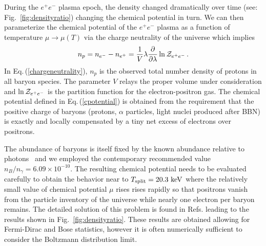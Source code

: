\documentclass[a4paper]{article}
\newcommand*{\keV}{\text{ keV}}
\newcommand{\req}[1]{Eq.\,(\ref{#1})}
\newcommand{\rf}[1]{Fig.~{\ref{#1}}}
\newcommand*{\xblue}{\color{black}}
\begin{document}
{\xblue During the $e^{+}e^{-}$ plasma epoch, the density changed dramatically over time (see: \rf{fig:densityratio}) changing the chemical potential in turn. We can then parameterize the chemical potential of the $e^{+}e^{-}$ plasma as a function of temperature $\mu\rightarrow\mu(T)$ via the charge neutrality of the universe which implies}
\begin{align}
    \label{chargeneutrality}
    n_{p}=n_{e^{-}}-n_{e^{+}}=\frac{1}{V}\lambda\frac{\partial}{\partial\lambda}\ln{\cal Z}_{e^{+}e^{-}}\,.
\end{align}
{\xblue In \req{chargeneutrality}, $n_{p}$ is the observed total number density of protons in all baryon species. The parameter $V$ relays the proper volume under consideration and $\ln{\cal Z}_{e^{+}e^{-}}$ is the partition function for the electron-positron gas. The chemical potential defined in \req{cpotential} is obtained from the requirement that the positive charge of baryons (protons, $\alpha$ particles, light nuclei produced after BBN) is exactly and locally compensated by a tiny net excess of electrons over positrons.}

{\xblue The abundance of baryons is itself fixed by the known abundance relative to photons~\cite{workman2022pdg} and we employed the contemporary recommended value $n_B/n_\gamma=6.09\times 10^{-10}$.} The resulting chemical potential  needs to be evaluated carefully to obtain the behavior near to $T_{\rm split}=20.3\keV$ where the relatively {\xblue small value of chemical potential $\mu$} rises rises rapidly so that positrons vanish from the particle inventory of the universe while nearly one electron per baryon remains. The detailed solution of this problem is found in Refs.\;\cite{fromerth2012quarkgluon,rafelski2023short} leading to the results shown in \rf{fig:densityratio}. These results are obtained allowing for Fermi-Dirac and Bose statistics, however it is often numerically sufficient to consider the Boltzmann distribution limit.
\end{document}
